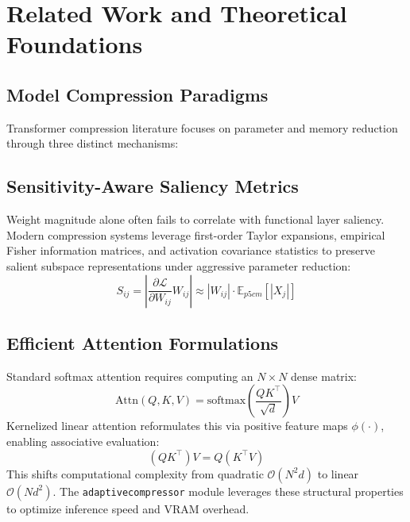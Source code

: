 \section{Related Work and Theoretical Foundations}

\subsection{Model Compression Paradigms}
Transformer compression literature focuses on parameter and memory reduction through three distinct mechanisms:

\subsection{Sensitivity-Aware Saliency Metrics}
Weight magnitude alone often fails to correlate with functional layer saliency. Modern compression systems leverage first-order Taylor expansions, empirical Fisher information matrices, and activation covariance statistics to preserve salient subspace representations under aggressive parameter reduction:
\[
S_{ij} = \left| \frac{\partial \mathcal{L}}{\partial W_{ij}} W_{ij} \right| \approx |W_{ij}| \cdot \mathbb{E}_{p{5cm}}[|X_j|]
\]

\subsection{Efficient Attention Formulations}
Standard softmax attention requires computing an $N \times N$ dense matrix:
\[
\text{Attn}(Q, K, V) = \text{softmax}\left(\frac{Q K^\top}{\sqrt{d}}\right) V
\]
Kernelized linear attention reformulates this via positive feature maps $\phi(\cdot)$, enabling associative evaluation:
\[
(Q K^\top) V = Q (K^\top V)
\]
This shifts computational complexity from quadratic $(N^2 d)$ to linear $(N d^2)$. The \texttt{adaptivecompressor} module leverages these structural properties to optimize inference speed and VRAM overhead.
